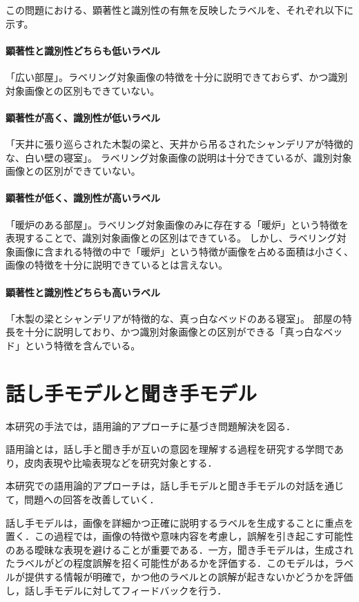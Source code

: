 \documentclass[a4paper,11pt]{jreport}
\begin{document}
この問題における、顕著性と識別性の有無を反映したラベルを、それぞれ以下に示す。

\paragraph*{顕著性と識別性どちらも低いラベル}
「広い部屋」。ラベリング対象画像の特徴を十分に説明できておらず、かつ識別対象画像との区別もできていない。
\paragraph*{顕著性が高く、識別性が低いラベル}
「天井に張り巡らされた木製の梁と、天井から吊るされたシャンデリアが特徴的な、白い壁の寝室」。
ラベリング対象画像の説明は十分できているが、識別対象画像との区別ができていない。
\paragraph*{顕著性が低く、識別性が高いラベル}
「暖炉のある部屋」。ラベリング対象画像のみに存在する「暖炉」という特徴を表現することで、識別対象画像との区別はできている。
しかし、ラベリング対象画像に含まれる特徴の中で「暖炉」という特徴が画像を占める面積は小さく、
画像の特徴を十分に説明できているとは言えない。
\paragraph*{顕著性と識別性どちらも高いラベル}
「木製の梁とシャンデリアが特徴的な、真っ白なベッドのある寝室」。
部屋の特長を十分に説明しており、かつ識別対象画像との区別ができる「真っ白なベッド」という特徴を含んでいる。

\section{話し手モデルと聞き手モデル}

本研究の手法では，語用論的アプローチに基づき問題解決を図る．

語用論とは，話し手と聞き手が互いの意図を理解する過程を研究する学問であり，皮肉表現や比喩表現などを研究対象とする．

本研究での語用論的アプローチは，話し手モデルと聞き手モデルの対話を通じて，問題への回答を改善していく．

話し手モデルは，画像を詳細かつ正確に説明するラベルを生成することに重点を置く．この過程では，画像の特徴や意味内容を考慮し，誤解を引き起こす可能性のある曖昧な表現を避けることが重要である．一方，聞き手モデルは，生成されたラベルがどの程度誤解を招く可能性があるかを評価する．このモデルは，ラベルが提供する情報が明確で，かつ他のラベルとの誤解が起きないかどうかを評価し，話し手モデルに対してフィードバックを行う．
\end{document}
